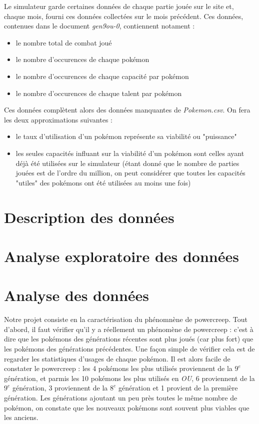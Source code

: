 \documentclass[a4paper,12pt]{article}
\begin{document}
Le simulateur garde certaines données de chaque partie jouée sur le site et,
chaque mois, fourni ces données collectées sur le mois précédent. Ces données,
contenues dans le document \textit{gen9ou-0}, contiennent notament :
\begin{itemize}
    \item le nombre total de combat joué
    \item le nombre d'occurences de chaque pokémon
    \item le nombre d'occurences de chaque capacité par pokémon
    \item le nombre d'occurences de chaque talent par pokémon
\end{itemize}
Ces données complètent alors des données manquantes de \textit{Pokemon.csv}. On
fera les deux approximations suivantes :
\begin{itemize}
    \item le taux d'utilisation d'un pokémon représente sa viabilité ou
    "puissance"
    \item les seules capacités influant sur la viabilité d'un pokémon sont
    celles ayant déjà été utilisées sur le simulateur (étant donné que le nombre
    de parties jouées est de l'ordre du million, on peut considérer que toutes
    les capacités "utiles" des pokémons ont été utilisées au moins une fois)
\end{itemize}

\section{Description des données}

\section{Analyse exploratoire des données}


\section{Analyse des données}

Notre projet consiste en la caractérisation du phénomnène de powercreep. Tout
d'abord, il faut vérifier qu'il y a réellement un phénomène de powercreep :
c'est à dire que les pokémons des générations récentes sont plus joués (car plus
fort) que les pokémons des générations précédentes. Une façon simple de vérifier
cela est de regarder les statistiques d'usages de chaque pokémon. Il est alors
facile de constater le powercreep : les 4 pokémons les plus utilisés proviennent
de la $9^{e}$ génération, et parmis les 10 pokémons les plus utilisés en
\textit{OU}, 6 proviennent de la $9^{e}$ génération, 3 proviennent de la $8^{e}$
génération et 1 provient de la première génération. Les générations ajoutant un
peu près toutes le même nombre de pokémon, on constate que les nouveaux pokémons
sont souvent plus viables que les anciens.
\end{document}
